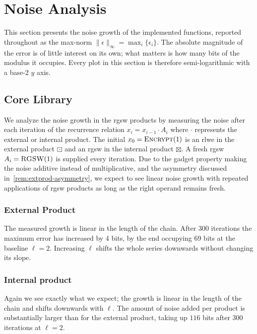 \section{Noise Analysis}
\label{sec:results:noise}
This section presents the noise growth of the implemented functions, reported throughout as the max-norm $\|\epsilon\|_\infty = \max_i\{\epsilon_i\}$. The absolute magnitude of the error is of little interest on its own; what matters is how many bits of the modulus it occupies. Every plot in this section is therefore semi-logarithmic with a base-2 $y$ axis. %

\subsection{Core Library}
We analyze the noise growth in the \gls{rgsw} products by measuring the noise after each iteration of the recurrence relation $x_i = x_{i-1} \cdot A_i$ where $\cdot$ represents the external or internal product. The initial $x_0 = \Call{Encrypt}{1}$ is an \gls{rlwe} in the external product $\boxdot$ and an \gls{rgsw} in the internal product $\boxtimes$. A fresh \gls{rgsw} $A_i = \Call{RGSW}{1}$ is supplied every iteration. Due to the gadget property making the noise additive instead of multiplicative, and the asymmetry discussed in~\cref{rem:extprod-asymmetry}, we expect to see linear noise growth with repeated applications of \gls{rgsw} products as long as the right operand remains fresh.

\subsubsection{External Product}
The measured growth is linear in the length of the chain. After 300 iterations the maximum error has increased by 4 bits, by the end occupying 69 bits at the baseline $\ell = 2$. Increasing $\ell$ shifts the whole series downwards without changing its slope.



\newpage
\subsubsection{Internal product}
Again we see exactly what we expect; the growth is linear in the length of the chain and shifts downwards with $\ell$. The amount of noise added per product is substantially larger than for the external product, taking up $116$ bits after 300 iterations at $\ell=2$. 

